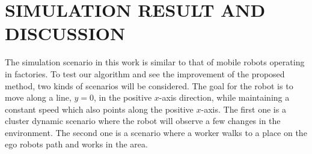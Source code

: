 \documentclass[letterpaper, 10 pt, conference]{ieeeconf}  %
\begin{document}
\section{SIMULATION RESULT AND DISCUSSION}
The simulation scenario in this work is similar to that of mobile robots operating in factories. To test our algorithm and see the improvement of the proposed method, two kinds of scenarios will be considered. The goal for the robot is to move along a line, $y=0$, in the positive $x$-axis direction, while maintaining a constant speed which also points along the positive $x$-axis. The first one is a cluster dynamic scenario where the robot will observe a few changes in the environment. The second one is a scenario where a worker walks to a place on the ego robots path and works in the area. 

\end{document}
